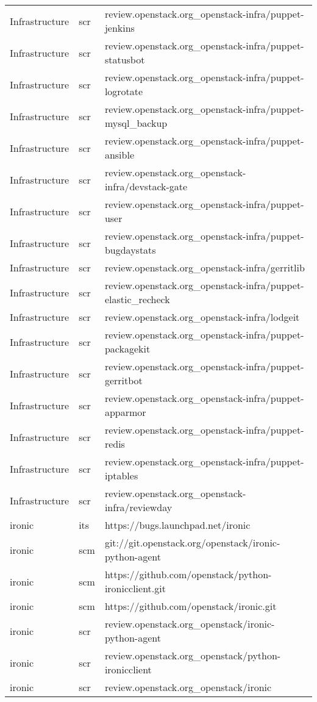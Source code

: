 \begin{center}
\begin{longtable}{|p{4cm}|p{1cm}|p{10cm}|}
Infrastructure&scr&review.openstack.org\_openstack-infra/puppet-jenkins\\ 
Infrastructure&scr&review.openstack.org\_openstack-infra/puppet-statusbot\\ 
Infrastructure&scr&review.openstack.org\_openstack-infra/puppet-logrotate\\ 
Infrastructure&scr&review.openstack.org\_openstack-infra/puppet-mysql\_backup\\ 
Infrastructure&scr&review.openstack.org\_openstack-infra/puppet-ansible\\ 
Infrastructure&scr&review.openstack.org\_openstack-infra/devstack-gate\\ 
Infrastructure&scr&review.openstack.org\_openstack-infra/puppet-user\\ 
Infrastructure&scr&review.openstack.org\_openstack-infra/puppet-bugdaystats\\ 
Infrastructure&scr&review.openstack.org\_openstack-infra/gerritlib\\ 
Infrastructure&scr&review.openstack.org\_openstack-infra/puppet-elastic\_recheck\\ 
Infrastructure&scr&review.openstack.org\_openstack-infra/lodgeit\\ 
Infrastructure&scr&review.openstack.org\_openstack-infra/puppet-packagekit\\ 
Infrastructure&scr&review.openstack.org\_openstack-infra/puppet-gerritbot\\ 
Infrastructure&scr&review.openstack.org\_openstack-infra/puppet-apparmor\\ 
Infrastructure&scr&review.openstack.org\_openstack-infra/puppet-redis\\ 
Infrastructure&scr&review.openstack.org\_openstack-infra/puppet-iptables\\ 
Infrastructure&scr&review.openstack.org\_openstack-infra/reviewday\\ 
ironic&its&https://bugs.launchpad.net/ironic\\ 
ironic&scm&git://git.openstack.org/openstack/ironic-python-agent\\ 
ironic&scm&https://github.com/openstack/python-ironicclient.git\\ 
ironic&scm&https://github.com/openstack/ironic.git\\ 
ironic&scr&review.openstack.org\_openstack/ironic-python-agent\\ 
ironic&scr&review.openstack.org\_openstack/python-ironicclient\\ 
ironic&scr&review.openstack.org\_openstack/ironic\\ 

\end{longtable}
\end{center}
